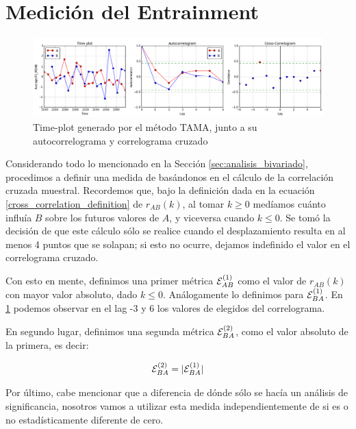 \section{Medición del Entrainment}
\label{sec:method_entrainment}

\begin{figure}
\centering
\includegraphics[width=15cm]{images/time_plot_with_cross_correlation.png}
\caption{Time-plot generado por el método TAMA, junto a su autocorrelograma y correlograma cruzado}
\label{fig:time_plot_with_bivariate}
\end{figure}

Considerando todo lo mencionado en la Sección \ref{sec:analisis_bivariado}, procedimos a definir una medida de \entrainment basándonos en el cálculo de la correlación cruzada muestral. Recordemos que, bajo la definición dada en la ecuación \ref{cross_correlation_definition} de $r_{AB}(k)$, al tomar $k \geq 0$ medíamos cuánto influía $B$ sobre los futuros valores de $A$, y viceversa cuando $k \leq 0$. Se tomó la decisión de que este cálculo sólo se realice cuando el desplazamiento resulta en al menos 4 puntos que se solapan; si esto no ocurre, dejamos indefinido el valor en el correlograma cruzado.

Con esto en mente, definimos una primer métrica $\mathcal{E}_{AB}^{(1)}$ como el valor de $r_{AB}(k)$ con mayor valor absoluto, dado $k \leq 0$. Análogamente lo definimos para $\mathcal{E}_{BA}^{(1)}$. En \ref{fig:time_plot_with_bivariate} podemos observar en el lag -3 y 6 los valores de \entrainment elegidos del correlograma.

En segundo lugar, definimos una segunda métrica $\mathcal{E}_{BA}^{(2)}$, como el valor absoluto de la primera, es decir:

\begin{equation}
\mathcal{E}_{BA}^{(2)} = |\mathcal{E}_{BA}^{(1)}|
\end{equation}

Por último, cabe mencionar que a diferencia de \cite{KOU2008.2} dónde sólo se hacía un análisis de significancia, nosotros vamos a utilizar esta medida independientemente de si es o no estadísticamente diferente de cero.
